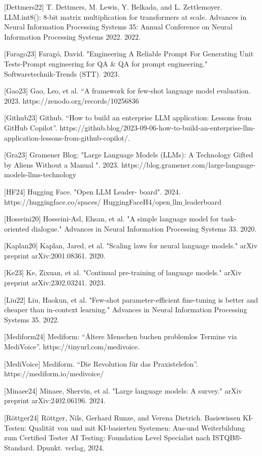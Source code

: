 \documentclass[twocolumn]{article}
\begin{document}
[Dettmers22] T. Dettmers, M. Lewis, Y. Belkada, and L. Zettlemoyer. LLM.int8(): 8-bit matrix multiplication for transformers at scale. Advances in Neural Information Processing Systems 35: Annual Conference on Neural Information Processing Systems 2022. 2022.

[Farago23] Faragó, David. "Engineering A Reliable Prompt For Generating Unit Tests-Prompt engineering for QA \& QA for prompt engineering." Softwaretechnik-Trends (STT). 2023.

[Gao23] Gao, Leo, et al. “A framework for few-shot language model evaluation. 2023. https://zenodo.org/records/10256836

[Github23] Github. “How to build an enterprise LLM application: Lessons from GitHub Copilot”. https://github.blog/2023-09-06-how-to-build-an-enterprise-llm-application-lessons-from-github-copilot/.

[Gra23] Gramener Blog: "Large Language Models (LLMs): A Technology Gifted by Aliens Without a Manual ". 2023. https://blog.gramener.com/large-language-models-llms-technology

[HF24] Hugging Face. "Open LLM Leader- board". 2024. https://huggingface.co/spaces/
HuggingFaceH4/open$\_$llm$\_$leaderboard

[Hosseini20] Hosseini-Asl, Ehsan, et al. "A simple language model for task-oriented dialogue." Advances in Neural Information Processing Systems 33. 2020.

[Kaplan20] Kaplan, Jared, et al. "Scaling laws for neural language models." arXiv preprint arXiv:2001.08361. 2020. 

[Ke23] Ke, Zixuan, et al. "Continual pre-training of language models." arXiv preprint arXiv:2302.03241. 2023.

[Liu22] Liu, Haokun, et al. "Few-shot parameter-efficient fine-tuning is better and cheaper than in-context learning." Advances in Neural Information Processing Systems 35. 2022.

[Mediform24] Mediform: “Ältere Menschen buchen problemlos Termine via MediVoice”. https://tinyurl.com/medivoice.

[MediVoice] Mediform. “Die Revolution für das Praxistelefon”. https://mediform.io/medivoice/

[Minaee24] Minaee, Shervin, et al. "Large language models: A survey." arXiv preprint arXiv:2402.06196. 2024.

[Röttger24] Röttger, Nils, Gerhard Runze, and Verena Dietrich. Basiswissen KI-Testen: Qualität von und mit KI-basierten Systemen: Aus-und Weiterbildung zum Certified Tester AI Testing: Foundation Level Specialist nach ISTQB®-Standard. Dpunkt. verlag, 2024.
\end{document}
